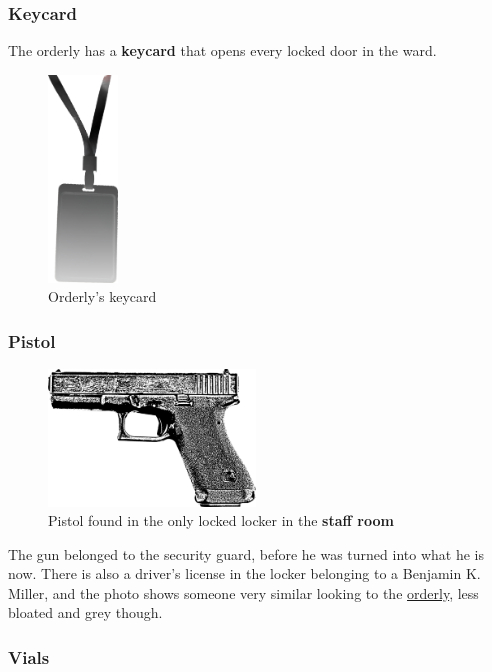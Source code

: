 \documentclass[bg-full]{resources/stylesheets/kult}
\begin{document}
\subsubsection{Keycard}%
\label{ssub:keycard}

The orderly has a \textbf{keycard} that opens every locked door in the ward.
\begin{figure}[!htbp]
  \includegraphics[height=5.5cm, keepaspectratio]{resources/img/keycard.png}
  \caption{Orderly's keycard}\label{keycard}
\end{figure}

\subsubsection{Pistol}%
\label{ssub:pistol}

\begin{figure}[!htbp]
  \includegraphics[width=5.5cm, keepaspectratio]{resources/img/glock.png}
  \caption{Pistol found in the only locked locker in the \textbf{staff room}}\label{pistol}
\end{figure}
The gun belonged to the security guard, before he was turned into what he is now.  There is also a driver's license in the
locker belonging to a Benjamin K. Miller, and the photo shows someone very similar looking to the
\hyperref[ssub:orderly]{orderly}, less bloated and grey though.


\subsubsection{Vials}%
\label{ssub:vials}
\end{document}
